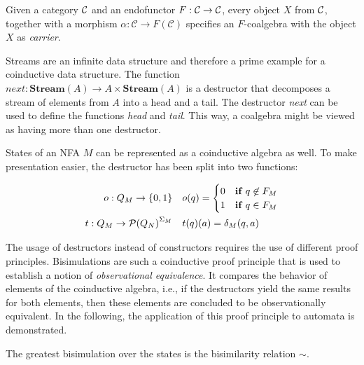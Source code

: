 \begin{definition}
    Given a category $\mathcal{C}$ and an endofunctor $F : \mathcal{C} \rightarrow \mathcal{C}$,
    every object $X$ from $\mathcal{C}$, together with a morphism
    $\alpha : \mathcal{C} \rightarrow F(\mathcal{C})$
    specifies an $F$-coalgebra with the object $X$ as \textit{carrier}.
\end{definition}

\begin{example}
    Streams are an infinite data structure and therefore
    a prime example for a coinductive data structure.
    The function
    $\textit{next} : \textbf{Stream}(A) \rightarrow A \times \textbf{Stream}(A)$
    is a destructor that decomposes a stream of elements from $A$ into a head and a tail.
    The destructor \textit{next} can be used to define the functions \textit{head} and \textit{tail}.
    This way, a coalgebra might be viewed as having more than one destructor.
\end{example}

\begin{example}
    States of an NFA $M$ can be represented as a coinductive algebra as well.
    To make presentation easier, the destructor has been split into two functions:

    \begin{align}
        o: Q_M \rightarrow \{0, 1\}\quad &o(q) =
            \begin{cases}
                0 & \textbf{if } q \not\in F_M\\
                1 & \textbf{if } q \in F_M
            \end{cases}\\
        t: Q_M \rightarrow {\mathcal{P}(Q_N)} ^{\Sigma_M} \quad & t(q)(a) = \delta_M(q, a)
    \end{align}
\end{example}

The usage of destructors instead of constructors requires the use of different proof principles.
Bisimulations are such a coinductive proof principle that is used to establish
a notion of \textit{observational equivalence}.
It compares the behavior of elements of the coinductive algebra,
i.e., if the destructors yield the same results for both elements, then these elements are concluded
to be observationally equivalent.
In the following, the application of this proof principle to automata is demonstrated.

\begin{definition}
    The greatest bisimulation over the states is the bisimilarity relation $\sim$.
\end{definition}

